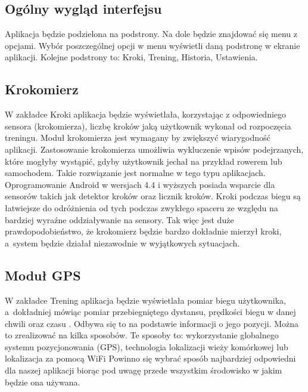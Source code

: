 \subsection{Ogólny wygląd interfejsu}  %

\hspace{0.60cm}Aplikacja będzie podzielona na podstrony. Na dole będzie znajdować się menu z opcjami. Wybór poszczególnej opcji w menu wyświetli daną podstronę w ekranie aplikacji. Kolejne podstrony to: Kroki, Trening, Historia, Ustawienia.

\subsection{Krokomierz}  %

\hspace{0.60cm}W zakładce Kroki aplikacja będzie wyświetlała, korzystając z odpowiedniego sensora (krokomierza), liczbę kroków jaką użytkownik wykonał od rozpoczęcia treningu. Moduł krokomierza jest wymagany by zwiększyć wiarygodność aplikacji. Zastosowanie krokomierza umożliwia wykluczenie wpisów podejrzanych, które mogłyby wystąpić, gdyby użytkownik jechał na przykład rowerem lub samochodem. Takie rozwiązanie jest normalne w tego typu aplikacjach. Oprogramowanie Android w wersjach 4.4 i wyższych posiada wsparcie dla sensorów takich jak detektor kroków oraz licznik kroków. Kroki podczas biegu są łatwiejsze do odróżnienia od tych podczas zwykłego spaceru ze względu na bardziej wyraźne oddziaływanie na sensory. Tak więc jest duże prawdopodobieństwo, że krokomierz będzie bardzo dokładnie mierzył kroki, a~system będzie działał niezawodnie w wyjątkowych sytuacjach.

\subsection{Moduł GPS}  %

\hspace{0.60cm}W zakładce Trening aplikacja będzie wyświetlała pomiar biegu użytkownika, a~dokładniej mówiąc pomiar przebiegniętego dystansu, prędkości biegu w danej chwili oraz czasu . Odbywa się to na podstawie informacji o jego pozycji. Można to zrealizować na kilka sposobów. Te sposoby to: wykorzystanie globalnego systemu pozycjonowania (GPS), technologia lokalizacji wieży komórkowej lub lokalizacja za pomocą WiFi Powinno się wybrać sposób najbardziej odpowiedni dla naszej aplikacji biorąc pod uwagę przede wszystkim środowisko w jakim będzie ona używana.

